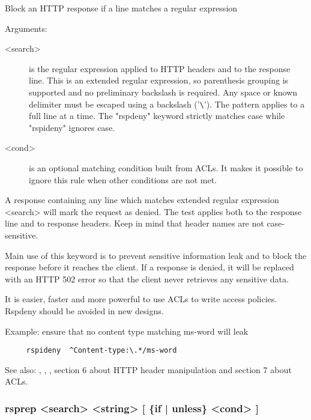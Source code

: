 
  Block an HTTP response if a line matches a regular expression


  Arguments:
  \begin{description}
  \item[<search>] is the regular expression applied to HTTP headers and to the
              response line. This is an extended regular expression, so
              parenthesis grouping is supported and no preliminary backslash
              is required. Any space or known delimiter must be escaped using
              a backslash ('\verb|\|'). The pattern applies to a full line at a time.
              The "rspdeny" keyword strictly matches case while "rspideny"
              ignores case.

  \item[<cond>] is an optional matching condition built from ACLs. It makes it
              possible to ignore this rule when other conditions are not met.
  \end{description}

  A response containing any line which matches extended regular expression
  <search> will mark the request as denied. The test applies both to the
  response line and to response headers. Keep in mind that header names are not
  case-sensitive.

  Main use of this keyword is to prevent sensitive information leak and to
  block the response before it reaches the client. If a response is denied, it
  will be replaced with an HTTP 502 error so that the client never retrieves
  any sensitive data.

  It is easier, faster and more powerful to use ACLs to write access policies.
  Rspdeny should be avoided in new designs.

  Example: ensure that no content type matching ms-word will leak
  \begin{verbatim}
     rspideny  ^Content-type:\.*/ms-word
  \end{verbatim}

  See also: , , , section 6 about HTTP header manipulation
            and section 7 about ACLs.

\subsubsection[rsprep]{rsprep <search> <string> [ \{if | unless\} <cond> ]}
